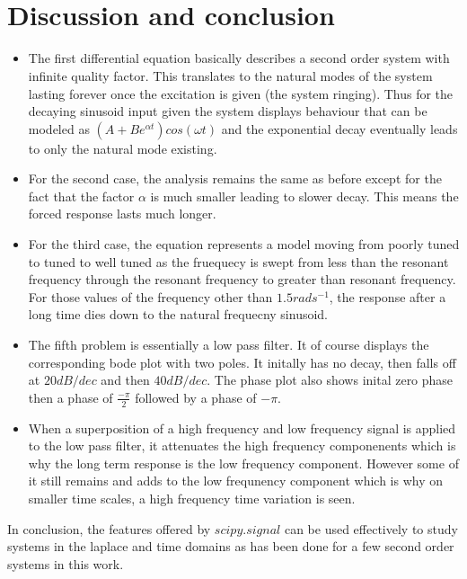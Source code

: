 \documentclass[a4paper, 12pt, margin= 1.25cm]{article}
\begin{document}
    \begin{center}
    \end{center}
    { \hspace*{\fill} \\}
    
    \begin{center}
    \end{center}
    { \hspace*{\fill} \\}
    
    \section{Discussion and conclusion}\label{discussion-and-conclusion}

    \begin{itemize}
\itemsep1pt\parskip0pt
\item
  The first differential equation basically describes a second order
  system with infinite quality factor. This translates to the natural
  modes of the system lasting forever once the excitation is given (the
  system ringing). Thus for the decaying sinusoid input given the system
  displays behaviour that can be modeled as $ (A +
  Be^{\alpha t})cos(\omega t)$ and the exponential decay
  eventually leads to only the natural mode existing.
\item
  For the second case, the analysis remains the same as before except
  for the fact that the factor $\alpha$ is much smaller leading to
  slower decay. This means the forced response lasts much longer.
\item
  For the third case, the equation represents a model moving from poorly
  tuned to tuned to well tuned as the fruequecy is swept from less than
  the resonant frequency through the resonant frequency to greater than
  resonant frequency. For those values of the frequency other than
  $1.5 rad s^{-1}$, the response after a long time dies down to the
  natural frequecny sinusoid.
\item
  The fifth problem is essentially a low pass filter. It of course
  displays the corresponding bode plot with two poles. It initally has
  no decay, then falls off at $20dB/dec$ and then $40 dB/dec$. The phase
  plot also shows inital zero phase then a phase of $\frac{-\pi}{2}$
  followed by a phase of $-\pi$.
\item
  When a superposition of a high frequency and low frequency signal is
  applied to the low pass filter, it attenuates the high frequency
  componenents which is why the long term response is the low frequency
  component. However some of it still remains and adds to the low
  frequnency component which is why on smaller time scales, a high
  frequency time variation is seen.
\end{itemize}

In conclusion, the features offered by $scipy.signal$ can be used
effectively to study systems in the laplace and time domains as has been
done for a few second order systems in this work.


    
    
    
    
\end{document}
